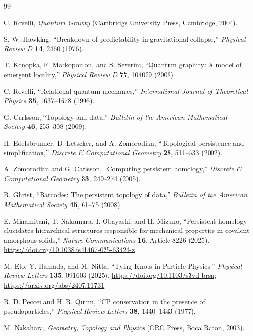 \documentclass[11pt]{article}
\begin{document}
\begin{thebibliography}{99}

C. Rovelli,
\textit{Quantum Gravity}
(Cambridge University Press, Cambridge, 2004).

S. W. Hawking,
``Breakdown of predictability in gravitational collapse,''
\textit{Physical Review D} \textbf{14}, 2460 (1976).

T. Konopka, F. Markopoulou, and S. Severini,
``Quantum graphity: A model of emergent locality,''
\textit{Physical Review D} \textbf{77}, 104029 (2008).

C. Rovelli,
``Relational quantum mechanics,''
\textit{International Journal of Theoretical Physics} \textbf{35}, 1637--1678 (1996).

G. Carlsson,
``Topology and data,''
\textit{Bulletin of the American Mathematical Society} \textbf{46}, 255--308 (2009).

H. Edelsbrunner, D. Letscher, and A. Zomorodian,
``Topological persistence and simplification,''
\textit{Discrete \& Computational Geometry} \textbf{28}, 511--533 (2002).

A. Zomorodian and G. Carlsson,
``Computing persistent homology,''
\textit{Discrete \& Computational Geometry} \textbf{33}, 249--274 (2005).

R. Ghrist,
``Barcodes: The persistent topology of data,''
\textit{Bulletin of the American Mathematical Society} \textbf{45}, 61--75 (2008).

E. Minamitani, T. Nakamura, I. Obayashi, and H. Mizuno,
``Persistent homology elucidates hierarchical structures responsible for mechanical properties in covalent amorphous solids,''
\textit{Nature Communications} \textbf{16}, Article 8226 (2025).
\url{https://doi.org/10.1038/s41467-025-63424-z}

M. Eto, Y. Hamada, and M. Nitta,
``Tying Knots in Particle Physics,''
\textit{Physical Review Letters} \textbf{135}, 091603 (2025).
\url{https://doi.org/10.1103/s3vd-brsn};
\url{https://arxiv.org/abs/2407.11731}

R. D. Peccei and H. R. Quinn,
``CP conservation in the presence of pseudoparticles,''
\textit{Physical Review Letters} \textbf{38}, 1440--1443 (1977).

M. Nakahara,
\textit{Geometry, Topology and Physics}
(CRC Press, Boca Raton, 2003).


\end{thebibliography}
\end{document}
